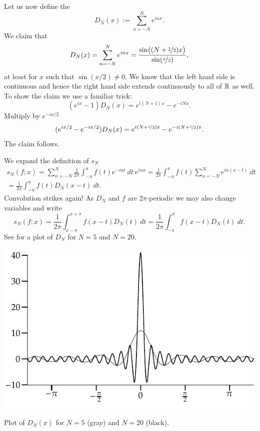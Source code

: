 Let us now define the \emph{}
\begin{equation*}
D_N(x) := \sum_{n=-N}^N e^{inx} .
\end{equation*}
We claim that
\begin{equation*}
D_N(x) =
\sum_{n=-N}^N e^{inx}
=
\frac{\sin\bigl( (N+\nicefrac{1}{2})x \bigr)}{\sin(\nicefrac{x}{2})} ,
\end{equation*}
at least for $x$ such that $\sin(x/2) \not= 0$.  We know that the left hand
side is continuous and hence the right hand side extends continuously to
all of ${\mathbb{R}}$ as well.
To show the claim
we use a familiar trick:
\begin{equation*}
(e^{ix}-1) D_N(x) = e^{i(N+1)x} - e^{-iNx} .
\end{equation*}
Multiply by $e^{-ix/2}$
\begin{equation*}
(e^{ix/2}-e^{-ix/2}) D_N(x) = e^{i(N+\nicefrac{1}{2})x} -
e^{-i(N+\nicefrac{1}{2})x} .
\end{equation*}
The claim follows.

We expand the definition of $s_N$
\begin{multline*}
s_N(f;x) = 
\sum_{n=-N}^N \frac{1}{2\pi} \int_{-\pi}^\pi f(t) e^{-int}  ~  dt ~ e^{inx}
=
\frac{1}{2\pi} \int_{-\pi}^\pi f(t) \sum_{n=-N}^N e^{in(x-t)} ~ dt
\\
=
\frac{1}{2\pi} \int_{-\pi}^\pi f(t) D_N(x-t) ~ dt .
\end{multline*}
Convolution strikes again!
As $D_N$ and $f$ are $2\pi$-periodic we may also change variables and write 
\begin{equation*}
s_N(f;x) = 
\frac{1}{2\pi} \int_{x-\pi}^{x+\pi} f(x-t) D_N(t) ~ dt
=
\frac{1}{2\pi} \int_{-\pi}^\pi f(x-t) D_N(t) ~ dt .
\end{equation*}
See  for a plot of $D_N$ for $N=5$ and $N=20$.

\begin{myfigureht}
\includegraphics{figures/approxdeltas}
\caption{Plot of $D_N(x)$ for $N=5$ (gray) and $N=20$
(black).\label{fig:approxdeltas}}
\end{myfigureht}

